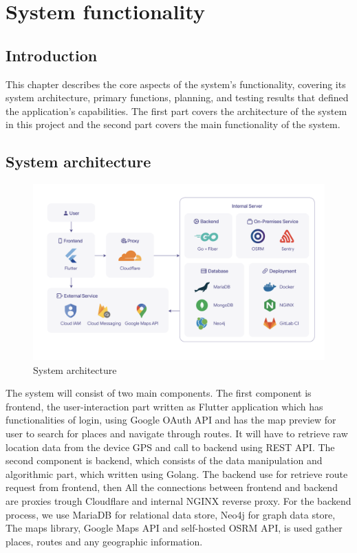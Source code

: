\chapter{System functionality}
\section{Introduction}
This chapter describes the core aspects of the system's functionality, covering its system architecture, primary functions, planning, and testing results that defined the application's capabilities. The first part covers the architecture of the system in this project and the second part covers the main functionality of the system.
\section{System architecture}

\begin{figure}[!h]
    \centering
    \includegraphics[width=1\linewidth]{chapter4/sysarch.png}
    \caption{System architecture}
    \label{fig:System architecture}
\end{figure}
The system will consist of two main components. The first component is frontend, the user-interaction part written as Flutter application which has functionalities of login, using Google OAuth API and has the map preview for user to search for places and navigate through routes. It will have to retrieve raw location data from the device GPS and call to backend using REST API. The second component is backend, which consists of the data manipulation and algorithmic part, which written using Golang. The backend use for retrieve route request from frontend, then All the connections between frontend and backend are proxies trough Cloudflare and internal NGINX reverse proxy. For the backend process, we use MariaDB for relational data store, Neo4j \cite{neo4j} for graph data store, The maps library, Google Maps API and self-hosted OSRM API, is used gather places, routes and any geographic information.

